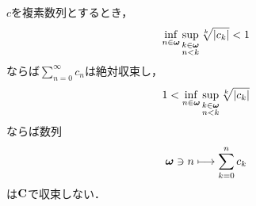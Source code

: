 	\begin{screen}
		\begin{thm}[Cauchyの冪根判定法]
			$c$を複素数列とするとき，
			\begin{align}
				\operatorname*{inf}_{n \in {\boldsymbol \omega}} \operatorname*{sup}_{\substack{k \in {\boldsymbol \omega} \\ n < k}} \sqrt[k]{|c_{k}|} < 1
			\end{align}
			ならば$\sum_{n=0}^{\infty} c_{n}$は絶対収束し，
			\begin{align}
				1 < \operatorname*{inf}_{n \in {\boldsymbol \omega}} \operatorname*{sup}_{\substack{k \in {\boldsymbol \omega} \\ n < k}} \sqrt[k]{|c_{k}|}
			\end{align}
			ならば数列
			\begin{align}
				{\boldsymbol \omega} \ni n \longmapsto \sum_{k=0}^{n} c_{k}
			\end{align}
			は$\mathbf{C}$で収束しない．
		\end{thm}
	\end{screen}
	
